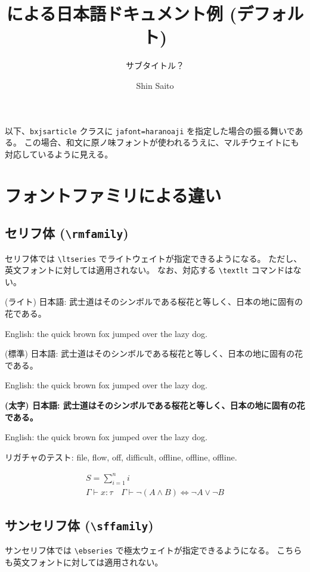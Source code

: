 \documentclass[xelatex,a4paper,ja=standard,jafont=haranoaji]{bxjsarticle}
\title{\XeLaTeX による日本語ドキュメント例 (デフォルト)}
\subtitle{サブタイトル？}
\author{Shin Saito}
\newcommand{\jasample}{武士道はそのシンボルである桜花と等しく、日本の地に固有の花である。}
\begin{document}
\maketitle

以下、\texttt{bxjsarticle} クラスに \texttt{jafont=haranoaji} を指定した場合の振る舞いである。
この場合、和文に原ノ味フォントが使われるうえに、マルチウェイトにも対応しているように見える。

\section{フォントファミリによる違い}

\subsection{セリフ体 (\texttt{\textbackslash rmfamily})}

セリフ体では \texttt{\textbackslash ltseries} でライトウェイトが指定できるようになる。
ただし、英文フォントに対しては適用されない。
なお、対応する \texttt{\textbackslash textlt} コマンドはない。

\rmfamily\LARGE

{\ltseries (ライト) 日本語: \jasample

English: the quick brown fox jumped over the lazy dog.}

{\mdseries (標準) 日本語: \jasample

English: the quick brown fox jumped over the lazy dog.}

{\bfseries (太字) 日本語: \jasample

English: the quick brown fox jumped over the lazy dog.}

{\mdseries リガチャのテスト: file, flow, off, difficult, offline, off\/line, off\textcompwordmark line.}
 
\normalsize
\begin{gather*}
    S = \sum_{i=1}^n i \\
    \Gamma \vdash x \colon \tau \quad \Gamma \vdash {\neg(A\land B)} \iff {\neg A} \lor {\neg B}
\end{gather*}

\subsection{サンセリフ体 (\texttt{\textbackslash sffamily})}

サンセリフ体では \texttt{\textbackslash ebseries} で極太ウェイトが指定できるようになる。
こちらも英文フォントに対しては適用されない。
\end{document}
